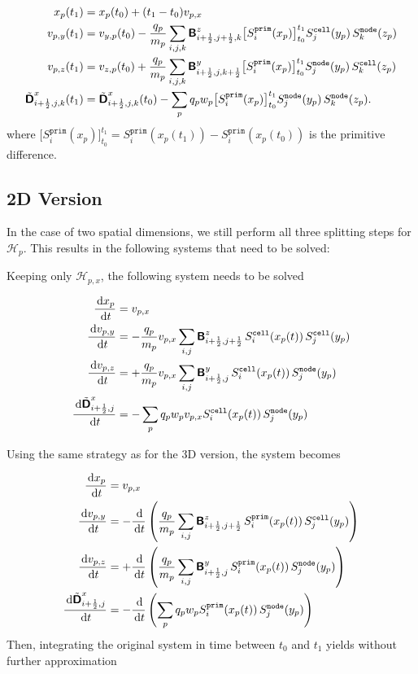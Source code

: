 \documentclass[11pt]{article}
\newcommand{\cell}{\texttt{cell}}
\newcommand{\node}{\texttt{node}}
\newcommand{\prim}{\texttt{prim}}
\begin{document}
$$
\begin{aligned}
    x_p&(t_1) = x_p(t_0) + (t_1-t_0) v_{p,x} \\
    v_{p, y}&(t_1) = v_{y,p}(t_0) -  
    \frac{q_p}{m_p} \sum_{i,j,k} \arrB^{z}_{\iph,\jph,k} \big[S^\prim_i(x_p)\big]_{t_0}^{t_1} S^\cell_j(y_p) \, S^\node_k(z_p)    
    \\
    v_{p, z}&(t_1) =  v_{z,p}(t_0) + 
    \frac{q_p}{m_p} \sum_{i,j,k} \arrB^{y}_{\iph,j,\kph} \big[S^\prim_i(x_p)\big]_{t_0}^{t_1}  S^\node_j(y_p) \, S^\cell_k(z_p)
    \\
    \tilde{\arrD}^{x}_{\iph,j,k} & (t_1) =  \tilde{\arrD}^{x}_{\iph,j,k}(t_0) - 
    \sum_p q_p w_p \big[S^\prim_i(x_p)\big]_{t_0}^{t_1}  S^\node_j(y_p) \,S^\node_k(z_p).
\end{aligned}
$$
where $\big[S^\prim_i(x_p)\big]_{t_0}^{t_1} = S^\prim_i(x_p(t_1))-S^\prim_i(x_p(t_0))$ is the primitive difference.

\subsection{2D Version}
In the case of two spatial dimensions, we still perform all three splitting steps for $\mathcal{H}_{p}$. This results in the following systems that need to be solved:

Keeping only $\mathcal{H}_{p,x}$, the following system needs to be solved

$$
\begin{aligned}
    \fract{x_p}{t} &= v_{p,x} \\
    \fract{v_{p, y}}{t} &= -\frac{q_p}{m_p} v_{p,x} \sum_{i,j} \arrB^{z}_{\iph,\jph} \,S^\cell_i(x_p(t))\,S^\cell_j(y_p)\\
    \fract{v_{p, z}}{t} &= +\frac{q_p}{m_p} v_{p,x} \sum_{i,j} \arrB^{y}_{\iph,j} \,S^\cell_i(x_p(t))\,S^\node_j(y_p)\\
    \fract{\tilde{\arrD}^{x}_{\iph,j}}{t} &= - \sum_p q_p w_p v_{p,x} S^\cell_i(x_p(t))\, S^\node_j(y_p)  
\end{aligned}
$$

Using the same strategy as for the 3D version, the system becomes

$$
\begin{aligned}
    \fract{x_p}{t} &= v_{p,x} \\
    \fract{v_{p, y}}{t} &= -\fract{}{t} \left(\frac{q_p}{m_p} \sum_{i,j} \arrB^{z}_{\iph,\jph} \,S^\prim_i(x_p(t))\,S^\cell_j(y_p) \right)\\
    \fract{v_{p, z}}{t} &= +\fract{}{t} \left(\frac{q_p}{m_p} \sum_{i,j} \arrB^{y}_{\iph,j} \,S^\prim_i(x_p(t))\,S^\node_j(y_p) \right)\\
    \fract{\tilde{\arrD}^{x}_{\iph,j}}{t} &= - \fract{}{t}\left(\sum_p q_p w_p S^\prim_i(x_p(t))\, S^\node_j(y_p) \right)   
\end{aligned}
$$
Then, integrating the original system in time between $t_0$ and $t_1$ yields without further approximation
\end{document}
